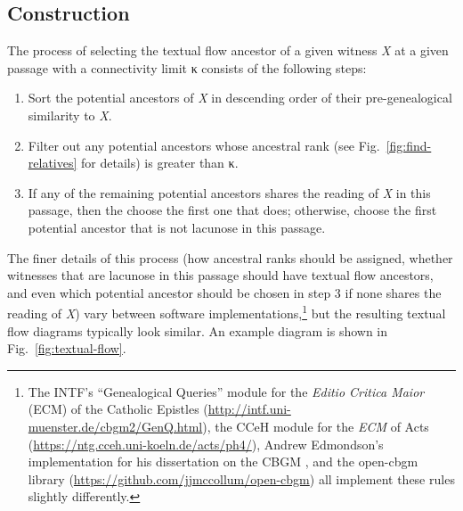 \documentclass[a4paper, 12pt]{article}
\begin{document}
	\newpage
	
	\subsection{Construction}
	
	The process of selecting the textual flow ancestor of a given witness \emph{X} at a given passage with a connectivity limit κ consists of the following steps:
	\begin{enumerate}
		\item Sort the potential ancestors of \emph{X} in descending order of their pre-genealogical similarity to \emph{X}.
		\item Filter out any potential ancestors whose ancestral rank (see Fig.~\ref{fig:find-relatives} for details) is greater than κ.
		\item If any of the remaining potential ancestors shares the reading of \emph{X} in this passage, then the choose the first one that does; otherwise, choose the first potential ancestor that is not lacunose in this passage.
	\end{enumerate}
	The finer details of this process (how ancestral ranks should be assigned, whether witnesses that are lacunose in this passage should have textual flow ancestors, and even which potential ancestor should be chosen in step 3 if none shares the reading of \emph{X}) vary between software implementations,\footnote{The INTF's ``Genealogical Queries'' module for the \emph{Editio Critica Maior} (ECM) of the Catholic Epistles (\url{http://intf.uni-muenster.de/cbgm2/GenQ.html}), the CCeH module for the \emph{ECM} of Acts (\url{https://ntg.cceh.uni-koeln.de/acts/ph4/}), Andrew Edmondson's implementation for his dissertation on the CBGM \parencite[code available online at \url{https://github.com/edmondac/CBGM} {[DOI \href{http://doi.org/10.5281/zenodo.1296288}{10.5281/zenodo.1296288}]}]{Edmondson19}, and the \textsf{open-cbgm} library (\url{https://github.com/jjmccollum/open-cbgm}) all implement these rules slightly differently.} but the resulting textual flow diagrams typically look similar. An example diagram is shown in Fig.~\ref{fig:textual-flow}.
	
\end{document}

